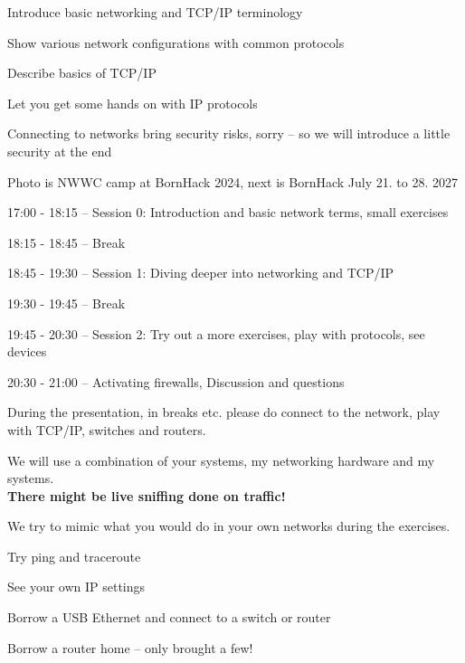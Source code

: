 \documentclass[Screen16to9,17pt]{foils}
\begin{document}


\begin{list2}
\item Introduce basic networking and TCP/IP terminology
\item Show various network configurations with common protocols
\item Describe basics of TCP/IP
\item Let you get some hands on with IP protocols
\item Connecting to networks bring security risks, sorry -- so we will introduce a little security at the end
\end{list2}

Photo is NWWC camp at BornHack 2024, next is BornHack July 21. to 28. 2027 




\begin{list1}
\item 17:00 - 18:15 -- Session 0: Introduction and basic network terms, small exercises
\item 18:15 - 18:45 -- Break
\item 18:45 - 19:30 -- Session 1: Diving deeper into networking and TCP/IP
\item 19:30 - 19:45 -- Break
\item 19:45 - 20:30 -- Session 2: Try out a more exercises, play with protocols, see devices
\item 20:30 - 21:00 -- Activating firewalls, Discussion and questions
\end{list1}

During the presentation, in breaks etc. please do connect to the network, play with TCP/IP, switches and routers.




We will use a combination of your systems, my networking hardware and my systems.\\
{\color{red} \bf There might be live sniffing done on traffic!}

We try to mimic what you would do in your own networks during the exercises.

\begin{list2}
\item Try ping and traceroute
\item See your own IP settings
\item Borrow a USB Ethernet and connect to a switch or router
\item Borrow a router home -- only brought a few!
\end{list2}
\end{document}
